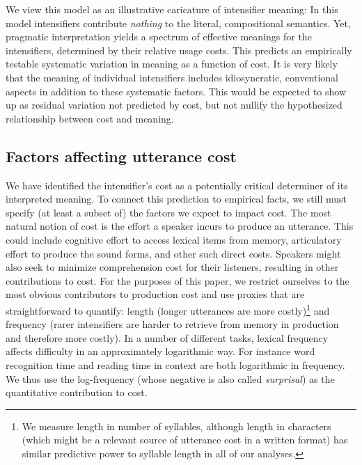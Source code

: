 \documentclass[10pt,letterpaper]{article}
\begin{document}
We view this model as an illustrative caricature of intensifier meaning: In this model intensifiers contribute \emph{nothing} to the literal, compositional semantics. Yet, pragmatic interpretation yields a spectrum of effective meanings for the intensifiers, determined by their relative usage costs. This predicts an empirically testable systematic variation in meaning as a function of cost.
It is very likely that the meaning of individual intensifiers includes idiosyncratic, conventional aspects in addition to these systematic factors. This would be expected to show up as residual variation not predicted by cost, but not nullify the hypothesized relationship between cost and meaning.


% 


\subsection{Factors affecting utterance cost}

We have identified the intensifier's cost as a potentially critical determiner of its interpreted meaning. To connect this prediction to empirical facts, we still must specify (at least a subset of) the factors we expect to impact cost.
The most natural notion of cost is the effort a speaker incurs to produce an utterance. This could include cognitive effort to access lexical items from memory, articulatory effort to produce 
the sound forms, and other such direct costs.
Speakers might also seek to minimize comprehension cost for their listeners, resulting in other contributions to cost. 
For the purposes of this paper, we restrict ourselves to the most
obvious contributors to production cost and use proxies that are straightforward to quantify: length (longer utterances are more costly)\footnote{
  We measure length in number of syllables, although length in characters (which might be a relevant source of utterance cost in a written format) has similar predictive power to syllable length in all of our analyses.
}
and frequency (rarer intensifiers are harder to retrieve from memory in production and therefore more costly).
In a number of different tasks, lexical frequency affects difficulty in an approximately logarithmic way. For instance word recognition time \cite{McCusker1977} 
and reading time in context \cite{smithLevy} are both logarithmic in frequency. We thus use the log-frequency (whose negative is also called \emph{surprisal}) as the quantitative contribution to cost.
\end{document}
